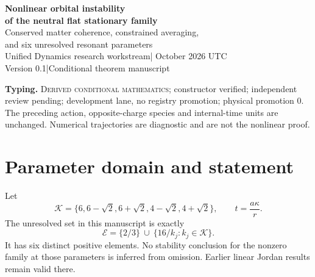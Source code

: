 \documentclass[11pt,a4paper]{article}
\begin{document}
\begin{center}
{\Large\bfseries Nonlinear orbital instability\\of the neutral flat stationary family}\\[8pt]
{\large Conserved matter coherence, constrained averaging,\\and six unresolved resonant parameters}\\[10pt]
Unified Dynamics research workstream\quad | October 2026 UTC\\
Version 0.1\quad |\quad Conditional theorem manuscript
\end{center}
\begin{abstract}
For the candidate joint tetrahedral link--matter Hamiltonian, a parity-conjugation transform makes both matter vectors co-move under the same anti-Hermitian operator. Their full Gram matrix is conserved, and an exactly force-canceling sector follows. These identities reduce the nonlinear stability problem to a controlled weak-source limit. A first-order finite-Fourier averaging argument constructs fixed-norm, Gauss-admissible perturbations whose size tends to zero but whose higher-simplex matter population reaches a positive value at internal times of order $1/\varepsilon$. Four field resonances are treated separately in the force-canceling sector. The nonzero flat family is therefore nonlinearly orbitally unstable at every finite rank except for six explicitly listed positive parameter values not settled here. The zero-stiffness case is also unstable by exact field drift. This is an obstruction within a declared action, not a claim about physical forces.
\end{abstract}
\textbf{Typing.} \textsc{Derived conditional mathematics}; constructor verified; independent review pending; development lane, no registry promotion; physical promotion $0$. The preceding action, opposite-charge species and internal-time units are unchanged. Numerical trajectories are diagnostic and are not the nonlinear proof.

\section{Parameter domain and statement}
Let
\[
\mathcal K=\{6,6-\sqrt2,6+\sqrt2,4-\sqrt2,4+\sqrt2\},\qquad t=\frac{a\kappa}{r}.
\]
The unresolved set in this manuscript is exactly
\begin{equation}
\boxed{\mathcal E=\{2/3\}\ \cup\ \{16/k_j:k_j\in\mathcal K\}.}\label{eq:exceptions}
\end{equation}
It has six distinct positive elements. No stability conclusion for the nonzero family at those parameters is inferred from omission. Earlier linear Jordan results remain valid there.
\end{document}
